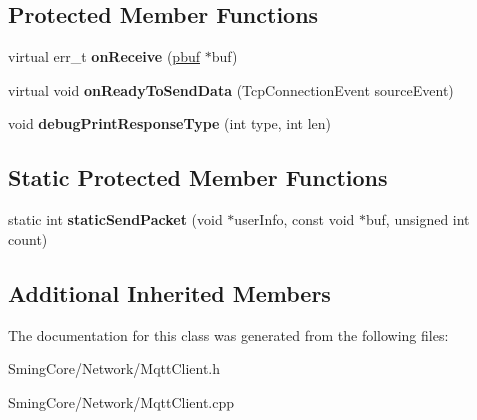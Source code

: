 \subsection*{Protected Member Functions}
\begin{DoxyCompactItemize}
\item 
\hypertarget{class_mqtt_client_a64d332ee4caddc73030f4bc5f26cd60f}{}virtual err\+\_\+t {\bfseries on\+Receive} (\hyperlink{structpbuf}{pbuf} $\ast$buf)\label{class_mqtt_client_a64d332ee4caddc73030f4bc5f26cd60f}

\item 
\hypertarget{class_mqtt_client_ad9f0e46e11d19c0f766242d20048c70c}{}virtual void {\bfseries on\+Ready\+To\+Send\+Data} (Tcp\+Connection\+Event source\+Event)\label{class_mqtt_client_ad9f0e46e11d19c0f766242d20048c70c}

\item 
\hypertarget{class_mqtt_client_a6a515cf9e00ae813a7dbfa172a081db6}{}void {\bfseries debug\+Print\+Response\+Type} (int type, int len)\label{class_mqtt_client_a6a515cf9e00ae813a7dbfa172a081db6}

\end{DoxyCompactItemize}
\subsection*{Static Protected Member Functions}
\begin{DoxyCompactItemize}
\item 
\hypertarget{class_mqtt_client_ac6bf0f650f5b29708bce6b10235806aa}{}static int {\bfseries static\+Send\+Packet} (void $\ast$user\+Info, const void $\ast$buf, unsigned int count)\label{class_mqtt_client_ac6bf0f650f5b29708bce6b10235806aa}

\end{DoxyCompactItemize}
\subsection*{Additional Inherited Members}


The documentation for this class was generated from the following files\+:\begin{DoxyCompactItemize}
\item 
Sming\+Core/\+Network/Mqtt\+Client.\+h\item 
Sming\+Core/\+Network/Mqtt\+Client.\+cpp\end{DoxyCompactItemize}

